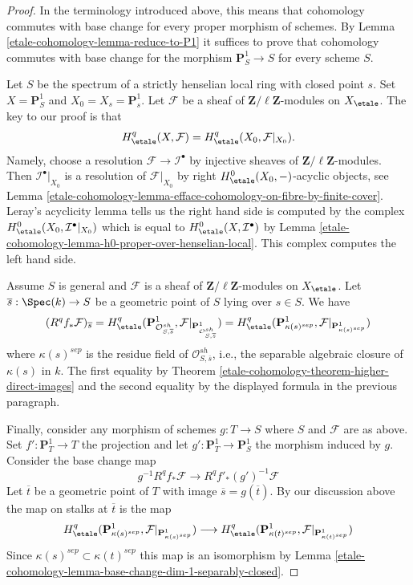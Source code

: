 \begin{proof}
In the terminology introduced above, this means that cohomology commutes
with base change for every proper morphism of schemes. By
Lemma \ref{etale-cohomology-lemma-reduce-to-P1}
it suffices to prove that cohomology commutes with base change
for the morphism $\mathbf{P}^1_S \to S$ for every scheme $S$.

\medskip\noindent
Let $S$ be the spectrum of a strictly henselian local ring with closed
point $s$. Set $X = \mathbf{P}^1_S$ and $X_0 = X_s = \mathbf{P}^1_s$.
Let $\mathcal{F}$ be a sheaf of $\mathbf{Z}/\ell\mathbf{Z}$-modules
on $X_\etale$. The key to our proof is that
$$
H^q_\etale(X, \mathcal{F}) = H^q_\etale(X_0, \mathcal{F}|_{X_0}).
$$
Namely, choose a resolution $\mathcal{F} \to \mathcal{I}^\bullet$
by injective sheaves of $\mathbf{Z}/\ell\mathbf{Z}$-modules.
Then $\mathcal{I}^\bullet|_{X_0}$ is a resolution of $\mathcal{F}|_{X_0}$
by right $H^0_\etale(X_0, -)$-acyclic objects, see
Lemma \ref{etale-cohomology-lemma-efface-cohomology-on-fibre-by-finite-cover}.
Leray's acyclicity lemma tells us the right hand side is computed by
the complex $H^0_\etale(X_0, \mathcal{I}^\bullet|_{X_0})$
which is equal to $H^0_\etale(X, \mathcal{I}^\bullet)$ by
Lemma \ref{etale-cohomology-lemma-h0-proper-over-henselian-local}. This complex
computes the left hand side.

\medskip\noindent
Assume $S$ is general and $\mathcal{F}$ is a sheaf of
$\mathbf{Z}/\ell\mathbf{Z}$-modules on $X_\etale$.
Let $\overline{s} : \Spec(k) \to S$ be a geometric point
of $S$ lying over $s \in S$. We have
$$
(R^qf_*\mathcal{F})_{\overline{s}} =
H^q_\etale(\mathbf{P}^1_{\mathcal{O}_{S, \overline{s}}^{sh}},
\mathcal{F}|_{\mathbf{P}^1_{\mathcal{O}_{S, \overline{s}}^{sh}}}) =
H^q_\etale(\mathbf{P}^1_{\kappa(s)^{sep}},
\mathcal{F}|_{\mathbf{P}^1_{\kappa(s)^{sep}}})
$$
where $\kappa(s)^{sep}$ is the residue field of
$\mathcal{O}_{S, \overline{s}}^{sh}$, i.e., the separable algebraic
closure of $\kappa(s)$ in $k$.
The first equality by Theorem \ref{etale-cohomology-theorem-higher-direct-images}
and the second equality by the displayed formula in the
previous paragraph.

\medskip\noindent
Finally, consider any morphism of schemes $g : T \to S$ where
$S$ and $\mathcal{F}$ are as above.
Set $f' : \mathbf{P}^1_T \to T$ the projection and let
$g' : \mathbf{P}^1_T \to \mathbf{P}^1_S$ the morphism induced
by $g$. Consider the base change map
$$
g^{-1}R^qf_*\mathcal{F}
\longrightarrow
R^qf'_*(g')^{-1}\mathcal{F}
$$
Let $\overline{t}$ be a geometric point of $T$ with image
$\overline{s} = g(\overline{t})$. By our discussion
above the map on stalks at $\overline{t}$ is the map
$$
H^q_\etale(\mathbf{P}^1_{\kappa(s)^{sep}},
\mathcal{F}|_{\mathbf{P}^1_{\kappa(s)^{sep}}})
\longrightarrow
H^q_\etale(\mathbf{P}^1_{\kappa(t)^{sep}},
\mathcal{F}|_{\mathbf{P}^1_{\kappa(t)^{sep}}})
$$
Since $\kappa(s)^{sep} \subset \kappa(t)^{sep}$ this map is an
isomorphism by Lemma \ref{etale-cohomology-lemma-base-change-dim-1-separably-closed}.


\end{proof}
